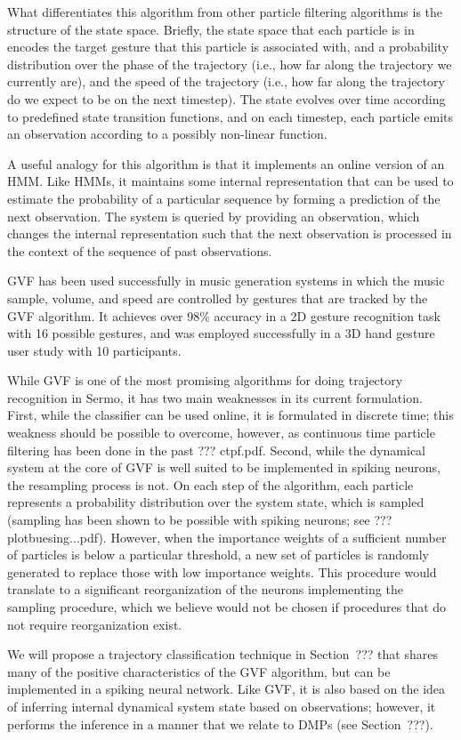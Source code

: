 What differentiates this algorithm from
other particle filtering algorithms
is the structure of the state space.
Briefly, the state space that each particle is in
encodes the target gesture that this particle
is associated with,
and a probability distribution
over the phase of the trajectory
(i.e., how far along the trajectory
we currently are),
and the speed of the trajectory
(i.e., how far along the trajectory
do we expect to be on the next timestep).
The state evolves over time according to
predefined state transition functions,
and on each timestep,
each particle emits an observation
according to a possibly non-linear function.

A useful analogy for this algorithm
is that it implements an online version of an HMM.
Like HMMs, it maintains some internal representation
that can be used to estimate the probability
of a particular sequence
by forming a prediction
of the next observation.
The system is queried by providing
an observation,
which changes the internal representation
such that the next observation
is processed in the context of
the sequence of past observations.

GVF has been used successfully
in music generation systems
in which the music sample,
volume, and speed are
controlled by gestures
that are tracked by the GVF algorithm.
It achieves over 98\% accuracy
in a 2D gesture recognition task
with 16 possible gestures,
and was employed successfully
in a 3D hand gesture user study
with 10 participants.

While GVF is one of the most promising
algorithms for doing trajectory recognition
in Sermo,
it has two main weaknesses in its current formulation.
First, while the classifier can be used online,
it is formulated in discrete time;
this weakness should be possible to overcome,
however, as continuous time particle filtering
has been done in the past
??? ctpf.pdf.
Second, while the dynamical system
at the core of GVF is well suited
to be implemented in spiking neurons,
the resampling process is not.
On each step of the algorithm,
each particle represents a probability
distribution over the system state,
which is sampled
(sampling has been shown to be
possible with spiking neurons;
see ??? plotbuesing...pdf).
However, when the importance weights
of a sufficient number of particles
is below a particular threshold,
a new set of particles
is randomly generated
to replace those with low importance weights.
This procedure would translate to
a significant reorganization
of the neurons implementing
the sampling procedure,
which we believe
would not be chosen if
procedures that do not require
reorganization exist.

We will propose a trajectory classification technique
in Section~??? that shares many of the positive
characteristics of the GVF algorithm,
but can be implemented in a spiking neural network.
Like GVF, it is also based on the idea
of inferring internal dynamical system state
based on observations;
however, it performs the inference
in a manner that we relate to
DMPs (see Section~???).
